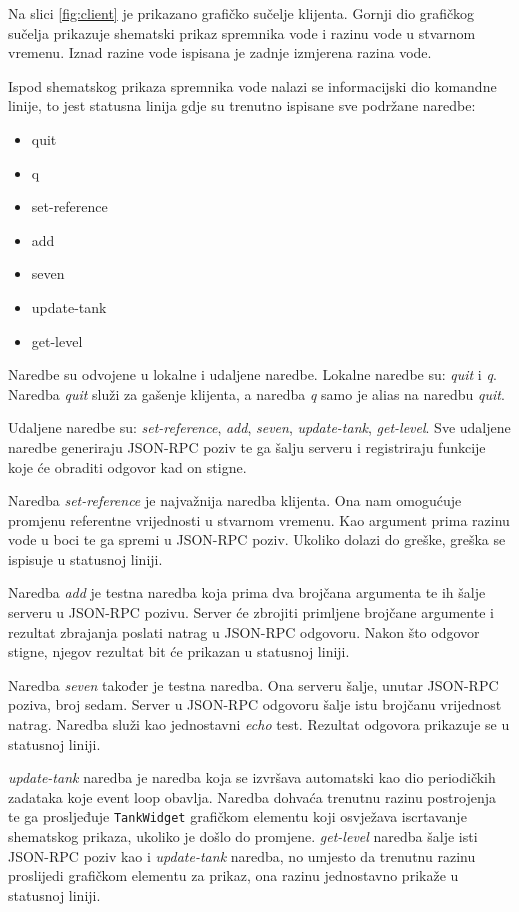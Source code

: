 Na slici \ref{fig:client} je prikazano grafičko sučelje klijenta. Gornji dio
grafičkog sučelja prikazuje shematski prikaz spremnika vode i razinu vode u
stvarnom vremenu. Iznad razine vode ispisana je zadnje izmjerena razina vode.

Ispod shematskog prikaza spremnika vode nalazi se informacijski dio komandne
linije, to jest statusna linija gdje su trenutno ispisane sve podržane naredbe:
\begin{itemize}
    \item quit
    \item q
    \item set-reference
    \item add
    \item seven
    \item update-tank
    \item get-level
\end{itemize}

Naredbe su odvojene u lokalne i udaljene naredbe. Lokalne naredbe su: \emph{quit}
i \emph{q}. Naredba \emph{quit} služi za gašenje klijenta, a naredba \emph{q}
samo je alias na naredbu \emph{quit}.

Udaljene naredbe su: \emph{set-reference}, \emph{add}, \emph{seven},
\emph{update-tank}, \emph{get-level}. Sve udaljene naredbe generiraju JSON-RPC
poziv te ga šalju serveru i registriraju funkcije koje će obraditi odgovor kad
on stigne.

Naredba \emph{set-reference} je najvažnija naredba klijenta. Ona nam omogućuje
promjenu referentne vrijednosti u stvarnom vremenu. Kao argument prima razinu
vode u boci te ga spremi u JSON-RPC poziv. Ukoliko dolazi do greške, greška se
ispisuje u statusnoj liniji.

Naredba \emph{add} je testna naredba koja prima dva brojčana argumenta te ih
šalje serveru u JSON-RPC pozivu. Server će zbrojiti primljene brojčane argumente
i rezultat zbrajanja poslati natrag u JSON-RPC odgovoru. Nakon što odgovor
stigne, njegov rezultat bit će prikazan u statusnoj liniji.

Naredba \emph{seven} također je testna naredba. Ona serveru šalje, unutar
JSON-RPC poziva, broj sedam. Server u JSON-RPC odgovoru šalje istu brojčanu
vrijednost natrag. Naredba služi kao jednostavni \emph{echo} test. Rezultat
odgovora prikazuje se u statusnoj liniji.

\emph{update-tank} naredba je naredba koja se izvršava automatski kao dio
periodičkih zadataka koje event loop obavlja. Naredba dohvaća trenutnu razinu
postrojenja te ga prosljeđuje \texttt{TankWidget} grafičkom elementu
koji osvježava iscrtavanje shematskog prikaza, ukoliko je došlo do promjene.
\emph{get-level} naredba šalje isti JSON-RPC poziv kao i \emph{update-tank}
naredba, no umjesto da trenutnu razinu proslijedi grafičkom elementu za prikaz, ona
razinu jednostavno prikaže u statusnoj liniji.

